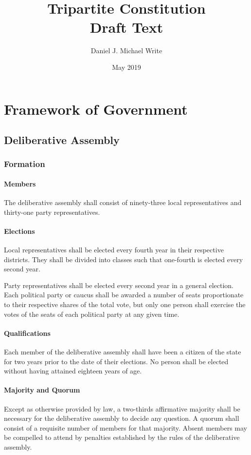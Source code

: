 \documentclass{article}
\title{Tripartite Constitution \\ Draft Text}
\date{May 2019}
\author{Daniel J. Michael Write}
\begin{document}
\maketitle
\newpage
\tableofcontents
\newpage
\section{Framework of Government}
\subsection{Deliberative Assembly}
\subsubsection{Formation}
\paragraph{Members}
The deliberative assembly shall consist of ninety-three local representatives and thirty-one party representatives.
\paragraph{Elections}
Local representatives shall be elected every fourth year in their respective districts. They shall be divided into classes such that one-fourth is elected every second year.

Party representatives shall be elected every second year in a general election. Each political party or caucus shall be awarded a number of seats proportionate to their respective shares of the total vote, but only one person shall exercise the votes of the seats of each political party at any given time.
\paragraph{Qualifications}
Each member of the deliberative assembly shall have been a citizen of the state for two years prior to the date of their elections. No person shall be elected without having attained eighteen years of age.
\paragraph{Majority and Quorum}
Except as otherwise provided by law, a two-thirds affirmative majority shall be necessary for the deliberative assembly to decide any question. A quorum shall consist of a requisite number of members for that majority. Absent members may be compelled to attend by penalties established by the rules of the deliberative assembly.
\end{document}
